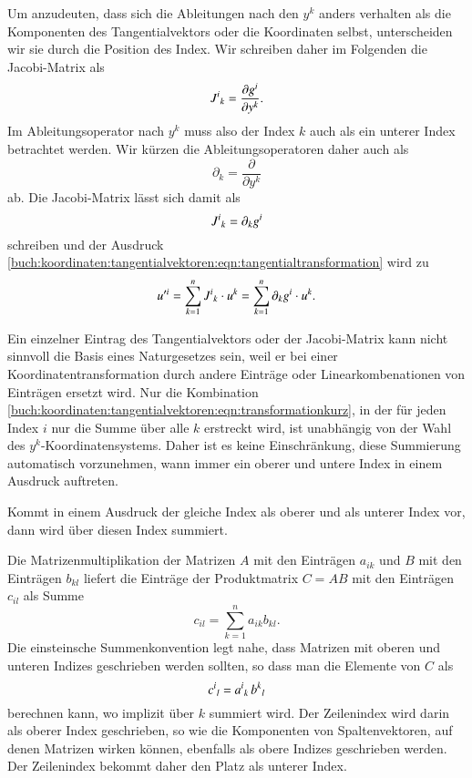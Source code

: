 Um anzudeuten, dass sich die Ableitungen nach den $y^k$ anders verhalten
als die Komponenten des Tangentialvektors oder die Koordinaten selbst,
unterscheiden wir sie durch die Position des Index.
Wir schreiben daher im Folgenden die Jacobi-Matrix als
\[
J^i\mathstrut_k
=
\frac{\partial g^i}{\partial y^k}.
\]
Im Ableitungsoperator nach $y^k$ muss also der Index $k$ auch als ein 
unterer Index betrachtet werden.
Wir kürzen die Ableitungsoperatoren daher auch als
\[
\partial_k = \frac{\partial}{\partial y^k}
\]
ab.
Die Jacobi-Matrix lässt sich damit als
\[
J^i\mathstrut_k = \partial_k g^i
\]
schreiben und der Ausdruck
\eqref{buch:koordinaten:tangentialvektoren:eqn:tangentialtransformation}
wird zu
\begin{equation}
u^{\prime i}
=
\sum_{k=1}^n J^i\mathstrut_k \cdot u^k
=
\sum_{k=1}^n \partial_kg^i\cdot u^k.
\label{buch:koordinaten:tangentialvektoren:eqn:transformationkurz}
\end{equation}

Ein einzelner Eintrag des Tangentialvektors oder der Jacobi-Matrix
kann nicht sinnvoll die Basis eines Naturgesetzes sein, weil er bei
einer Koordinatentransformation durch andere Einträge oder Linearkombenationen
von Einträgen ersetzt wird.
Nur die Kombination
\eqref{buch:koordinaten:tangentialvektoren:eqn:transformationkurz},
in der für jeden Index $i$ nur die Summe über alle $k$ erstreckt
wird, ist unabhängig von der Wahl des $y^k$-Koordinatensystems.
Daher ist es keine Einschränkung, diese Summierung automatisch
vorzunehmen, wann immer ein oberer und untere Index in einem Ausdruck
auftreten.

\begin{definition}
\label{buch:koordinaten:tangentialvektoren:def:einsteinschesummenkonvention}
%
Kommt in einem Ausdruck der gleiche Index als oberer und als unterer
Index vor, dann wird über diesen Index summiert.
\end{definition}

Die Matrizenmultiplikation der Matrizen $A$ mit den Einträgen $a_{ik}$ und
%
$B$ mit den Einträgen $b_{kl}$ liefert die Einträge der Produktmatrix
$C=AB$ mit den Einträgen $c_{il}$ als Summe
\[
c_{il}
=
\sum_{k=1}^n
a_{ik} b_{kl}.
\]
Die einsteinsche Summenkonvention legt nahe, dass Matrizen mit oberen
und unteren Indizes geschrieben werden sollten, so dass man die
Elemente von $C$ als
\[
c^i\mathstrut_l
=
a^i\mathstrut_k\,
b^k\mathstrut_l
\]
berechnen kann, wo implizit über $k$ summiert wird.
Der Zeilenindex wird darin als oberer Index geschrieben, so wie
%
die Komponenten von Spaltenvektoren, auf denen Matrizen wirken können, 
ebenfalls als obere Indizes geschrieben werden.
Der Zeilenindex bekommt daher den Platz als unterer Index.

